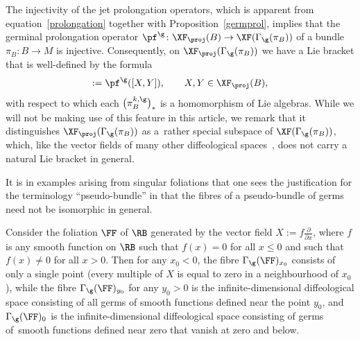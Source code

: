 The injectivity of the jet prolongation operators, which is apparent from equation~\eqref{prolongation} toge\-ther with Proposition~\ref{germprol}, implies that the germinal prolongation operator $\pf^{\g}\colon \XF_{\proj}(B)\rightarrow\XF(\Gamma_{\g}(\pi_{B}))$ of a bundle $\pi_{B}\colon B\rightarrow M$ is injective. Consequently, on $\XF_{\proj}(\Gamma_{\g}(\pi_{B}))$ we have a Lie bracket that is well-defined by the formula
\begin{gather*}
[\pf^{\g}(X),\pf^{\g}(Y)]:=\pf^{\g}([X,Y]),\qquad X,Y\in\XF_{\proj}(B),
\end{gather*}
with respect to which each $\big(\pi_{B}^{k,\g}\big)_{*}$ is a homomorphism of Lie algebras. While we will not be making use of this feature in this article, we remark that it distinguishes $\XF_{\proj}(\Gamma_{\g}(\pi_{B}))$ as a~rather special subspace of $\XF(\Gamma_{\g}(\pi_{B}))$, which, like the vector fields of many other diffeological spaces~\cite{cw}, does not carry a natural Lie bracket in general.

It is in examples arising from singular foliations that one sees the justification for the terminology ``pseudo-bundle'' in that the fibres of a pseudo-bundle of germs need not be isomorphic in general.

\begin{Example}\label{germfol}
Consider the foliation $\FF$ of $\RB$ generated by the vector field $X:=f\frac{\partial}{\partial x}$, where $f$ is any smooth function on $\RB$ such that $f(x) = 0$ for all $x\leq 0$ and such that $f(x)\neq 0$ for all $x>0$. Then for any $x_{0}<0$, the fibre $\Gamma_{\g}(\FF)_{x_{0}}$ consists of only a single point (every multiple of $X$ is equal to zero in a neighbourhood of $x_{0}$), while the fibre $\Gamma_{\g}(\FF)_{y_{0}}$ for any $y_{0}>0$ is the infinite-dimensional diffeological space consisting of all germs of smooth functions defined near the point $y_{0}$, and $\Gamma_{\g}(\FF)_{0}$ is the infinite-dimensional diffeological space consisting of germs of~smooth functions defined near zero that vanish at zero and below.
\end{Example}


